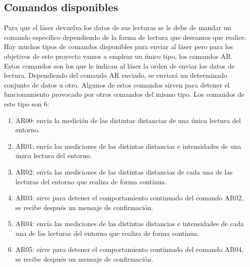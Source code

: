 \subsection{Comandos disponibles}

Para que el láser devuelva los datos de sus lecturas se le debe de mandar un comando específico dependiendo de la forma de lectura que deseamos que realice. Hay muchos tipos de comandos disponibles para enviar al láser pero para los objetivos de este proyecto vamos a emplear un único tipo, los comandos AR.\\
Estos comandos son los que le indican al láser la orden de enviar los datos de lectura. Dependiendo del comando AR enviado, se enviará un determinado conjunto de datos u otro. Algunos de estos comandos sirven para detener el funcionamiento provocado por otros comandos del mismo tipo. Los comandos de este tipo son 6:
\begin{enumerate}
	\item AR00: envía la medición de las distintas distancias de una única lectura del entorno.
	\item AR01: envía las mediciones de las distintas distancias e intensidades de una única lectura del entorno.
	\item AR02: envía las mediciones de las distintas distancias de cada una de las lecturas del entorno que realiza de forma contínua.
	\item AR03: sirve para detener el comportamiento continuado del comando AR02, se recibe después un mensaje de confirmación.
	\item AR04: envía las mediciones de las distintas distancias e intensidades de cada una de las lecturas del entorno que realiza de forma contínua.
	\item AR05: sirve para detener el comportamiento continuado del comando AR04, se recibe después un mensaje de confirmación.
\end{enumerate} 
